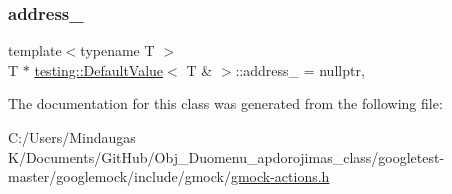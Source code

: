 \subsubsection{\texorpdfstring{address\_}{address\_}}
{\footnotesize\ttfamily template$<$typename T $>$ \\
T $\ast$ \mbox{\hyperlink{classtesting_1_1_default_value}{testing\+::\+Default\+Value}}$<$ T \& $>$\+::address\+\_\+ = nullptr\hspace{0.3cm}{\ttfamily [static]}, {\ttfamily [private]}}



The documentation for this class was generated from the following file\+:\begin{DoxyCompactItemize}
\item 
C\+:/\+Users/\+Mindaugas K/\+Documents/\+Git\+Hub/\+Obj\+\_\+\+Duomenu\+\_\+apdorojimas\+\_\+class/googletest-\/master/googlemock/include/gmock/\mbox{\hyperlink{googletest-master_2googlemock_2include_2gmock_2gmock-actions_8h}{gmock-\/actions.\+h}}\end{DoxyCompactItemize}
